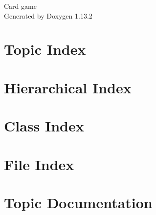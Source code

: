 \documentclass[twoside]{book}
\newcommand{\+}{\discretionary{\mbox{\scriptsize$\hookleftarrow$}}{}{}}
\newcommand{\clearemptydoublepage}{%
    \newpage{\pagestyle{empty}\cleardoublepage}%
  }
\begin{document}
  \raggedbottom
    \hypersetup{pageanchor=false,
                bookmarksnumbered=true,
                pdfencoding=unicode
               }
  \begin{titlepage}
  \vspace*{7cm}
  \begin{center}%
  {\Large Card game}\\
  \vspace*{1cm}
  {\large Generated by Doxygen 1.13.2}\\
  \end{center}
  \end{titlepage}
  \clearemptydoublepage
  \tableofcontents
  \clearemptydoublepage
  \hypersetup{pageanchor=true}




\chapter{Topic Index}

\chapter{Hierarchical Index}

\chapter{Class Index}

\chapter{File Index}

\chapter{Topic Documentation}




















\end{document}
